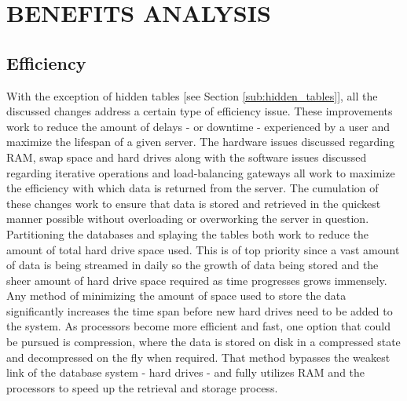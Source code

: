 \section{BENEFITS ANALYSIS} %
\label{sec:benefits_analysis}

\subsection{Efficiency} %
\label{sub:efficiency}
With the exception of hidden tables [see Section \ref{sub:hidden_tables}], all the discussed changes address a certain type of efficiency issue. These improvements work to reduce the amount of delays - or downtime - experienced by a user and maximize the lifespan of a given server.  The hardware issues discussed regarding RAM, swap space and hard drives along with the software issues discussed regarding iterative operations and load-balancing gateways all work to maximize the efficiency with which data is returned from the server.  The cumulation of these changes work to ensure that data is stored and retrieved in the quickest manner possible without overloading or overworking the server in question. Partitioning the databases and splaying the tables both work to reduce the amount of total hard drive space used.  This is of top priority since a vast amount of data is being streamed in daily so the growth of data being stored and the sheer amount of hard drive space required as time progresses grows immensely.  Any method of minimizing the amount of space used to store the data significantly increases the time span before new hard drives need to be added to the system.  As processors become more efficient and fast, one option that could be pursued is compression, where the data is stored on disk in a compressed state and decompressed on the fly when required.  That method bypasses the weakest link of the database system - hard drives - and fully utilizes RAM and the processors to speed up the retrieval and storage process.


